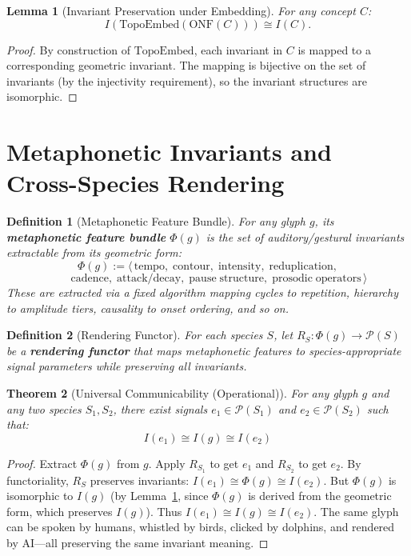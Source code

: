 \documentclass[12pt, letterpaper]{book}
\def\mathfrak#1{#1}%
\newtheorem{theorem}{Theorem}[chapter]
\newtheorem{lemma}[theorem]{Lemma}
\newtheorem{definition}{Definition}[chapter]
\begin{document}
\begin{lemma}[Invariant Preservation under Embedding]\label{lem:inv-embed}
For any concept $C$:
\[
I(\mathrm{TopoEmbed}(\mathrm{ONF}(C))) \cong I(C).
\]
\end{lemma}

\begin{proof}
By construction of $\mathrm{TopoEmbed}$, each invariant in $C$ is mapped to a corresponding geometric invariant. The mapping is bijective on the set of invariants (by the injectivity requirement), so the invariant structures are isomorphic.
\end{proof}

\section{Metaphonetic Invariants and Cross-Species Rendering}

\begin{definition}[Metaphonetic Feature Bundle]\label{def:metaphonetic-bundle}
For any glyph $\mathfrak{g}$, its \textbf{metaphonetic feature bundle} $\Phi(\mathfrak{g})$ is the set of auditory/gestural invariants extractable from its geometric form:
\[
\Phi(\mathfrak{g}) := \langle\, \mathrm{tempo},\; \mathrm{contour},\; \mathrm{intensity},\; \mathrm{reduplication},
\]
\[
\qquad \mathrm{cadence},\; \mathrm{attack/decay},\; \mathrm{pause\;structure},\; \mathrm{prosodic\;operators}\, \rangle
\]
These are extracted via a fixed algorithm mapping cycles to repetition, hierarchy to amplitude tiers, causality to onset ordering, and so on.
\end{definition}

\begin{definition}[Rendering Functor]\label{def:rendering-functor}
For each species $S$, let $R_S: \Phi(\mathfrak{g}) \to \mathcal{P}(S)$ be a \textbf{rendering functor} that maps metaphonetic features to species-appropriate signal parameters while preserving all invariants.
\end{definition}

\begin{theorem}[Universal Communicability (Operational)]\label{thm:univ-comm-op}
For any glyph $\mathfrak{g}$ and any two species $S_1, S_2$, there exist signals $e_1 \in \mathcal{P}(S_1)$ and $e_2 \in \mathcal{P}(S_2)$ such that:
\[
I(e_1) \cong I(\mathfrak{g}) \cong I(e_2)
\]
\end{theorem}

\begin{proof}
Extract $\Phi(\mathfrak{g})$ from $\mathfrak{g}$. Apply $R_{S_1}$ to get $e_1$ and $R_{S_2}$ to get $e_2$. By functoriality, $R_S$ preserves invariants: $I(e_1) \cong \Phi(\mathfrak{g}) \cong I(e_2)$. But $\Phi(\mathfrak{g})$ is isomorphic to $I(\mathfrak{g})$ (by Lemma~\ref{lem:inv-embed}, since $\Phi(\mathfrak{g})$ is derived from the geometric form, which preserves $I(\mathfrak{g})$). Thus $I(e_1) \cong I(\mathfrak{g}) \cong I(e_2)$. The same glyph can be spoken by humans, whistled by birds, clicked by dolphins, and rendered by AI---all preserving the same invariant meaning.
\end{proof}
\end{document}
